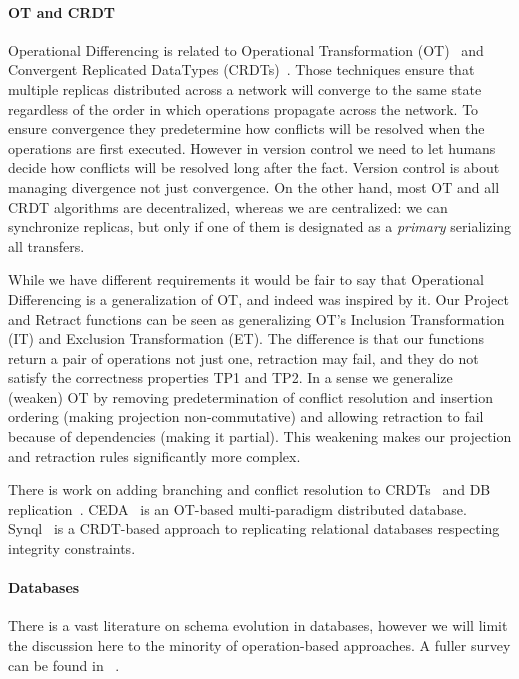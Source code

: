 \documentclass[english,submission]{programming}
\theoremstyle{definition}
\newcommand{\citet}[1]{\citeauthor*{#1}~\cite{#1}}
\begin{document}
\paragraph{OT and CRDT}

Operational Differencing is related to
Operational Transformation (OT)~\cite{ceda-ot, Ellis89, Ressel96, Oster06} and Convergent Replicated DataTypes (CRDTs)~\cite{Shapiro11}.
Those techniques ensure that multiple replicas distributed across a network will converge to the same state regardless of the order in which operations propagate across the network. To ensure convergence they predetermine how conflicts will be resolved when the operations are first executed. However in version control we need to let humans decide how conflicts will be resolved long after the fact. Version control is about managing divergence not just convergence. On the other hand, most OT and all CRDT algorithms are decentralized, whereas we are centralized: we can synchronize replicas, but only if one of them is designated as a \textit{primary} serializing all transfers.

While we have different requirements it would be fair to say that Operational Differencing is a generalization of OT, and indeed was inspired by it. Our Project and Retract functions can be seen as generalizing OT's Inclusion Transformation (IT) and Exclusion Transformation (ET). The difference is that our functions return a pair of operations not just one, retraction may fail, and they do not satisfy the correctness properties TP1 and TP2. In a sense we generalize (weaken) OT by removing predetermination of conflict resolution and insertion ordering (making projection non-commutative) and allowing retraction to fail because of dependencies (making it partial). This weakening makes our projection and retraction rules significantly more complex.

There is work on adding branching and conflict resolution to CRDTs~\cite{patchwork, automerge-conflicts} and DB replication~\cite{couchdb-conflicts}.
CEDA~\cite{ceda} is an OT-based multi-paradigm distributed database.
Synql~\cite{ignat-synql} is a CRDT-based approach to replicating relational databases respecting integrity constraints.

\paragraph{Databases}

There is a vast literature on schema evolution in databases, however we will limit the discussion here to the minority of operation-based approaches. A fuller survey can be found in \citet{challenge-problems}.
\end{document}
